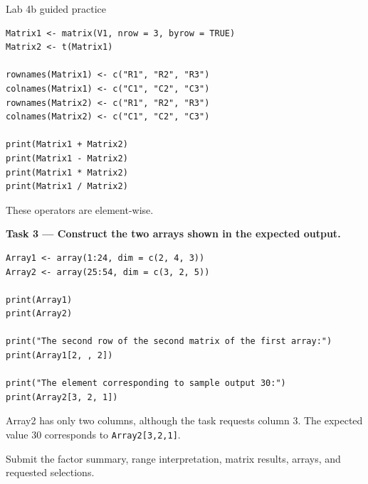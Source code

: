 \begin{labproject}{Lab 4b guided practice}
\begin{lstlisting}[style=dsr]
Matrix1 <- matrix(V1, nrow = 3, byrow = TRUE)
Matrix2 <- t(Matrix1)

rownames(Matrix1) <- c("R1", "R2", "R3")
colnames(Matrix1) <- c("C1", "C2", "C3")
rownames(Matrix2) <- c("R1", "R2", "R3")
colnames(Matrix2) <- c("C1", "C2", "C3")

print(Matrix1 + Matrix2)
print(Matrix1 - Matrix2)
print(Matrix1 * Matrix2)
print(Matrix1 / Matrix2)
\end{lstlisting}

These operators are element-wise.

\textbf{Task 3 --- Construct the two arrays shown in the expected output.}

\begin{lstlisting}[style=dsr]
Array1 <- array(1:24, dim = c(2, 4, 3))
Array2 <- array(25:54, dim = c(3, 2, 5))

print(Array1)
print(Array2)

print("The second row of the second matrix of the first array:")
print(Array1[2, , 2])

print("The element corresponding to sample output 30:")
print(Array2[3, 2, 1])
\end{lstlisting}

\begin{pitfall}
Array2 has only two columns, although the task requests column 3. The expected value 30 corresponds to \texttt{Array2[3,2,1]}.
\end{pitfall}
\end{labproject}

\begin{labdeliverable}
Submit the factor summary, range interpretation, matrix results, arrays, and requested selections.
\end{labdeliverable}
